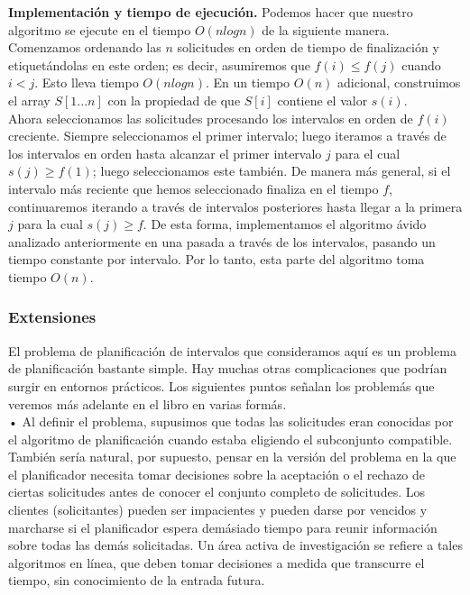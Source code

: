\documentclass[a4paper]{article}
\begin{document}
\textbf{Implementación y tiempo de ejecución.} Podemos hacer que nuestro algoritmo se ejecute en el tiempo $O(nlogn)$ de la siguiente manera. Comenzamos ordenando las $n$ solicitudes en orden de tiempo de finalización y etiquetándolas en este orden; es decir, asumiremos que $f(i) ≤ f(j)$ cuando $i<j$. Esto lleva tiempo $O(nlogn)$. En un tiempo $O(n)$ adicional, construimos el array $S[1...n]$ con la propiedad de que $S[i]$ contiene el valor $s(i)$.\\

Ahora seleccionamos las solicitudes procesando los intervalos en orden de $f(i)$ creciente. Siempre seleccionamos el primer intervalo; luego iteramos a través de los intervalos en orden hasta alcanzar el primer intervalo $j$ para el cual $s(j) ≥ f(1)$; luego seleccionamos este también. De manera más general, si el intervalo más reciente que hemos seleccionado finaliza en el tiempo $f$, continuaremos iterando a través de intervalos posteriores hasta llegar a la primera $j$ para la cual $s(j) ≥ f$. De esta forma, implementamos el algoritmo ávido analizado anteriormente en una pasada a través de los intervalos, pasando un tiempo constante por intervalo. Por lo tanto, esta parte del algoritmo toma tiempo $O(n)$.\\

\subsubsection*{Extensiones}

El problema de planificación de intervalos que consideramos aquí es un problema de planificación bastante simple. Hay muchas otras complicaciones que podrían surgir en entornos prácticos. Los siguientes puntos señalan los problemás que veremos más adelante en el libro en varias formás.\\

    • Al definir el problema, supusimos que todas las solicitudes eran conocidas por el algoritmo de planificación cuando estaba eligiendo el subconjunto compatible. También sería natural, por supuesto, pensar en la versión del problema en la que el planificador necesita tomar decisiones sobre la aceptación o el rechazo de ciertas solicitudes antes de conocer el conjunto completo de solicitudes. Los clientes (solicitantes) pueden ser impacientes y pueden darse por vencidos y marcharse si el planificador espera demásiado tiempo para reunir información sobre todas las demás solicitadas. Un área activa de investigación se refiere a tales algoritmos en línea, que deben tomar decisiones a medida que transcurre el tiempo, sin conocimiento de la entrada futura.\\
\end{document}
